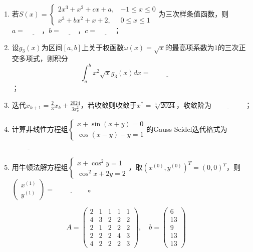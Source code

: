 \documentclass[12pt,a4paper]{article}
\begin{document}
\begin{enumerate}
    \item 若$S(x) = \begin{cases}
        2x^3 + x^2 + cx + a, & -1 \leq x \leq 0 \\
        x^3 + bx^2 + x + 2, & 0 \leq x \leq 1
    \end{cases}$为三次样条值函数，则\\
    $a = \underline{\hspace{1cm}}$，$b = \underline{\hspace{1cm}}$，$c = \underline{\hspace{1cm}}$；

    \item 设$g_3(x)$为区间$[a,b]$上关于权函数$\omega(x) = \sqrt{x}$的最高项系数为$1$的三次正交多项式，则积分$$\int_a^b x^2\sqrt{x}g_3(x)dx = \underline{\hspace{2cm}}$$；
    
    \item 迭代$x_{k+1} = \frac{2}{3}x_k + \frac{2024}{3x_k^2}$，若收敛则收敛于$x^* = \sqrt[3]{2024}$，收敛阶为$\underline{\hspace{2cm}}$；
    
    \item 计算非线性方程组$\begin{cases}
        x + \sin(x + y) = 0 \\
        \cos(x - y) - y = 1
    \end{cases}$的Gauss-Seidel迭代格式为$\underline{\hspace{2cm}}$
    
    \item 用牛顿法解方程组$\begin{cases}
        x + \cos^2 y = 1 \\
        \cos^2 x + 2y = 2
    \end{cases}$，取$(x^{(0)}, y^{(0)})^T = (0, 0)^T$，则$\begin{pmatrix}
        x^{(1)} \\
        y^{(1)}
    \end{pmatrix} = \underline{\hspace{2cm}}$。
\end{enumerate}

\bigskip
{}
$$
A = \begin{pmatrix}
    2 & 1 & 1 & 1 & 1 \\
    4 & 3 & 2 & 2 & 2 \\
    2 & 1 & 2 & 2 & 2 \\
    2 & 2 & 2 & 4 & 3 \\
    4 & 2 & 2 & 2 & 3
\end{pmatrix}, \quad
b = \begin{pmatrix}
    6 \\
    13 \\
    9 \\
    13 \\
    13
\end{pmatrix}
$$
\end{document}
